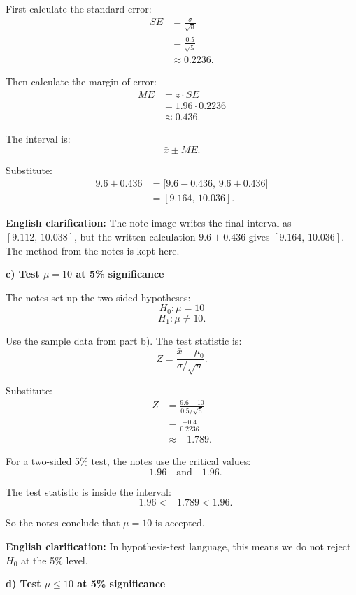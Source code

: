 \documentclass[10pt]{article}
\begin{document}
First calculate the standard error:
\begin{align*}
SE
&=
\frac{\sigma}{\sqrt{n}}
\\[2mm]
&=
\frac{0.5}{\sqrt{5}}
\\[2mm]
&\approx 0.2236.
\end{align*}

Then calculate the margin of error:
\begin{align*}
ME
&=
z\cdot SE
\\[2mm]
&=
1.96\cdot 0.2236
\\[2mm]
&\approx 0.436.
\end{align*}

The interval is:
\[
\bar{x}\pm ME.
\]

Substitute:
\begin{align*}
9.6 \pm 0.436
&=
\bigl[
9.6-0.436,\,
9.6+0.436
\bigr]
\\[2mm]
&=
[9.164,\,10.036].
\end{align*}

\textbf{English clarification:}
The note image writes the final interval as
\([9.112,\,10.038]\), but the written calculation
\(9.6\pm 0.436\) gives \([9.164,\,10.036]\).
The method from the notes is kept here.

\textbf{c) Test \(\mu=10\) at 5\% significance}

The notes set up the two-sided hypotheses:
\[
H_0:\mu=10
\]
\[
H_1:\mu\ne 10.
\]

Use the sample data from part b).
The test statistic is:
\[
Z=
\frac{\bar{x}-\mu_0}{\sigma/\sqrt{n}}.
\]

Substitute:
\begin{align*}
Z
&=
\frac{9.6-10}{0.5/\sqrt{5}}
\\[2mm]
&=
\frac{-0.4}{0.2236}
\\[2mm]
&\approx -1.789.
\end{align*}

For a two-sided 5\% test, the notes use the
critical values:
\[
-1.96
\quad\text{and}\quad
1.96.
\]

The test statistic is inside the interval:
\[
-1.96 < -1.789 < 1.96.
\]

So the notes conclude that \(\mu=10\) is accepted.

\textbf{English clarification:}
In hypothesis-test language, this means we do not
reject \(H_0\) at the 5\% level.

\textbf{d) Test \(\mu \le 10\) at 5\% significance}
\end{document}
